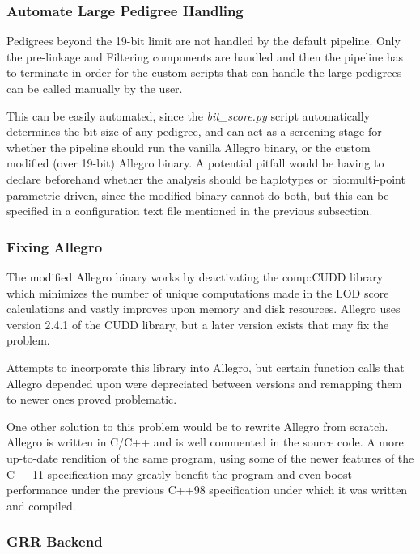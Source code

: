 \subsubsection{Automate Large Pedigree Handling}

Pedigrees beyond the 19-bit limit are not handled by the default pipeline. Only the pre-linkage and Filtering components are handled and then the pipeline has to terminate in order for the custom scripts that can handle the large pedigrees can be called manually by the user.

This can be easily automated, since the \textit{bit\_score.py} script automatically determines the bit-size of any pedigree, and can act as a screening stage for whether the pipeline should run the vanilla Allegro binary, or the custom modified (over 19-bit) Allegro binary. A potential pitfall would be having to declare beforehand whether the analysis should be haplotypes or \gls{bio:multi-point parametric} driven, since the modified binary cannot do both, but this can be specified in a configuration text file mentioned in the previous subsection.

\subsubsection{Fixing Allegro}

The modified Allegro binary works by deactivating the \gls{comp:CUDD} library which minimizes the number of unique computations made in the LOD score calculations and vastly improves upon memory and disk resources. Allegro uses version 2.4.1 of the CUDD library, but a later version exists that may fix the problem.

Attempts to incorporate this library into Allegro, but certain function calls that Allegro depended upon were depreciated between versions and remapping them to newer ones proved problematic. 

One other solution to this problem would be to rewrite Allegro from scratch. Allegro is written in C/C++ and is well commented in the source code. A more up-to-date rendition of the same program, using some of the newer features of the C++11 specification \cite{c++2011iso} may greatly benefit the program and even boost performance under the previous C++98 specification under which it was written and compiled.

\subsubsection{GRR Backend}

